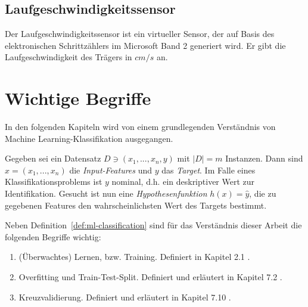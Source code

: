 \subsection{Laufgeschwindigkeitssensor}
Der Laufgeschwindigkeitssensor ist ein virtueller Sensor, der auf Basis des elektronischen Schrittzählers im Microsoft Band 2 generiert wird. Er gibt die Laufgeschwindigkeit des Trägers in $cm/s$ an.

\section{Wichtige Begriffe}
In den folgenden Kapiteln wird von einem grundlegenden Verständnis von Machine Learning-Klassifikation ausgegangen.

\begin{definition}[ML-Klassifikation]
\label{def:ml-classification}
Gegeben sei ein Datensatz $D \ni (x_1, ..., x_n, y)$ mit $|D| = m$ Instanzen. Dann sind $x = (x_1, ..., x_n)$ die \textit{Input-Features} und $y$ das \textit{Target}. Im Falle eines Klassifikationsproblems ist $y$ nominal, d.h. ein deskriptiver Wert zur Identifikation. Gesucht ist nun eine \textit{Hypothesenfunktion} $h(x) = \hat{y}$, die zu gegebenen Features den wahrscheinlichsten Wert des Targets bestimmt\cite{Ng2011a}.
\end{definition}
Neben Definition~\ref{def:ml-classification} sind für das Verständnis dieser Arbeit die folgenden Begriffe wichtig:
\begin{enumerate}
\item (Überwachtes) Lernen, bzw. Training. Definiert in Kapitel 2.1 \cite{Hastie2009}.
\item Overfitting und Train-Test-Split. Definiert und erläutert in Kapitel 7.2 \cite{Hastie2009}.
\item Kreuzvalidierung. Definiert und erläutert in Kapitel 7.10 \cite{Hastie2009}.
\end{enumerate}


